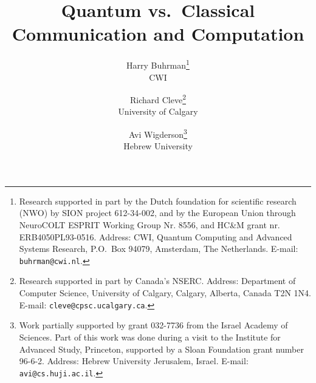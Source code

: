 
\title{Quantum vs.\ Classical Communication and Computation}

\author{
\parbox{2in}{
\begin{center}
Harry Buhrman\thanks{
Research  supported in part by the Dutch foundation for scientific
research (NWO) by SION project 612-34-002, and by the European Union through
NeuroCOLT ESPRIT Working Group Nr. 8556, and HC\&M grant nr. ERB4050PL93-0516.
Address: CWI, Quantum Computing and Advanced Systems Research,
P.O.\ Box 94079, Amsterdam, The Netherlands.
E-mail: {\tt buhrman@cwi.nl}.}\\CWI
\end{center}
}
\and
\parbox{2in}{
\begin{center}
Richard Cleve\thanks{
Research supported in part by Canada's  
NSERC. Address: Department of Computer Science, University of Calgary, 
Calgary, Alberta, Canada T2N 1N4.
E-mail: {\tt cleve@cpsc.ucalgary.ca}.}\\University of Calgary
\end{center}
}
\and
\parbox{2in}{
\begin{center}
Avi Wigderson\thanks{Work partially supported by grant 032-7736 from the 
Israel 
Academy of Sciences. Part of this work was done during a visit to the
Institute for Advanced Study, Princeton, supported by a Sloan
Foundation grant number 96-6-2.
Address: Hebrew University Jerusalem, Israel. E-mail: {\tt 
avi@cs.huji.ac.il}.}\\Hebrew University
\end{center}
}
}





